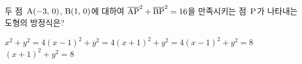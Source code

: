 두 점~$\mathrm{A}(-3,\,0)$, $\mathrm{B}(1,\,0)$에 대하여 $\overline{\mathrm{AP}}^2+\overline{\mathrm{BP}}^2=16$을 만족시키는 점~$\mathrm{P}$가 나타내는 도형의 방정식은?
\begin{choicesii}{$x^2+y^2=4$}{$(x-1)^2+y^2=4$}{$(x+1)^2+y^2=4$}{$(x-1)^2+y^2=8$}{$(x+1)^2+y^2=8$}\end{choicesii}
